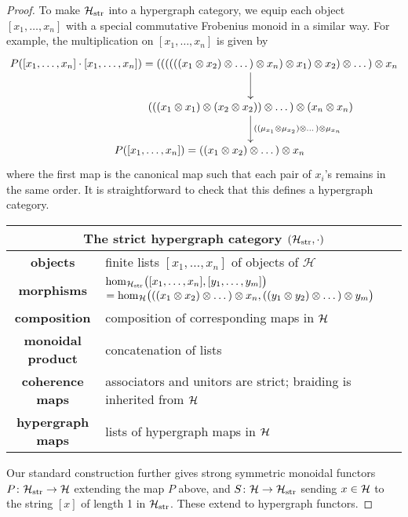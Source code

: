 \begin{proof}
  To make $\mathcal H_{\mathrm{str}}$ into a hypergraph category, we equip each
  object $[x_1,\dots,x_n]$ with a special commutative Frobenius monoid in a
  similar way. For example, the multiplication on $[x_1,\dots,x_n]$ is given by 
  \[
    \xymatrixcolsep{-4pt}
    \xymatrix{
      P([x_1,\dots,x_n]\cdot[x_1,&\dots,x_n])=
      ((((((x_1 \ot x_2) \ot \dots) \ot x_n) \ot x_1) \ot x_2) \ot \dots) \ot
      x_n \ar[d] \\
      &(((x_1 \ot x_1) \ot (x_2 \ot x_2)) \ot \dots) \ot (x_n \ot x_n)
      \ar[d]^{((\mu_{x_1} \ot \mu_{x_2}) \ot \dots ) \ot \mu_{x_n}} \\
      &P([x_1,\dots,x_n])=((x_1 \ot x_2) \ot \dots ) \ot x_n 
      \phantom{P([x_1,\dots,x_n])=}
    }
  \]
  where the first map is the canonical map such that each pair of $x_i$'s remains
  in the same order. It is straightforward to check that this defines a
  hypergraph category.
  \begin{center}
    \begin{tabular}{| c | p{} |}
      \hline
      \multicolumn{2}{|c|}{The strict hypergraph category $(\mathcal H_{\mathrm{str}},
      \cdot)$} \\
      \hline
      \textbf{objects} & finite lists $[x_1, \dots, x_n]$ of objects of
      $\mathcal H$ \\ 
      \textbf{morphisms} & $\mathrm{hom}_{\mathcal H_{\mathrm{str}}}\big([x_1, \dots,
      x_n],[y_1, \dots, y_m]\big)$ \newline $= \mathrm{hom}_{\mathcal H}\big(((x_1 \otimes x_2) \otimes
      \dots) \otimes x_n, ((y_1 \otimes y_2) \otimes \dots) \otimes y_m\big)$\\ 
      \textbf{composition} & composition of corresponding maps in $\mathcal H$ \\
      \textbf{monoidal product} & concatenation of lists \\
      \textbf{coherence maps} & associators and unitors are strict; braiding is
      inherited from $\mathcal H$  \\
      \textbf{hypergraph maps} & lists of hypergraph maps in $\mathcal H$ \\
      \hline
    \end{tabular}
  \end{center}

  Our standard construction further gives strong symmetric monoidal functors
  $P{\colon} \mathcal H_{\mathrm{str}} \to \mathcal H$ extending the map $P$ above, and
  $S{\colon} \mathcal H \to \mathcal H_{\mathrm{str}}$ sending $x \in \mathcal H$ to the string
  $[x]$ of length 1 in $\mathcal H_{\mathrm{str}}$. These extend to hypergraph
  functors.


\end{proof}
